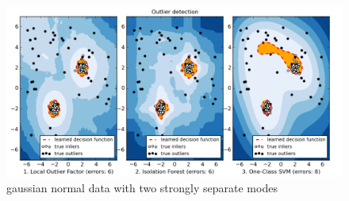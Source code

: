 \begin{figure}[H]
  \centering
  \includegraphics[width=.9\linewidth]{fig_source/ADcomparison3}
  \caption{gaussian normal data with two strongly separate modes}
  \label{fig:ADcomparison3}
\end{figure}

